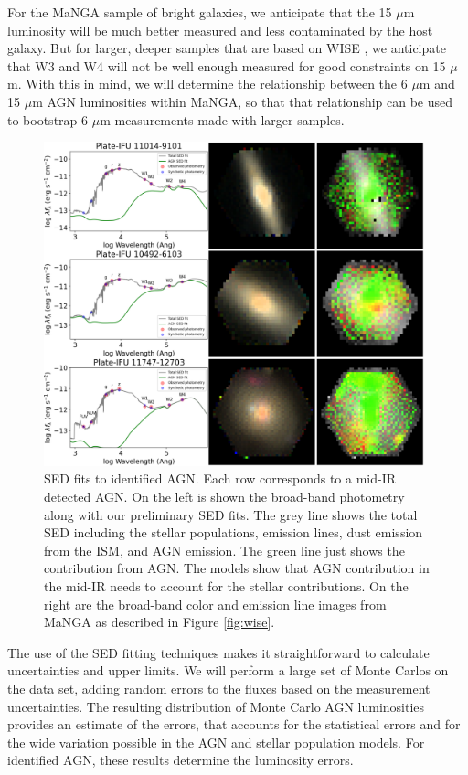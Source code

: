 \documentclass[12pt, preprint]{hacked-aastex}
\begin{document}
For the MaNGA sample of bright galaxies, we anticipate that the 
15 $\mu$m luminosity will be much better measured and less 
contaminated by the host galaxy.
But for larger, deeper samples that are based on  WISE 
\cite{assef18a, hviding22a}, we anticipate that W3 and W4 
will not be well enough measured for good constraints on 15 $\mu$m.
With this in mind, we will determine the relationship 
between the 6 $\mu$m and 15 $\mu$m AGN luminosities within MaNGA,
so that that relationship can be used to bootstrap 6 $\mu$m 
measurements made with larger samples.

\begin{figure}[t!]
\includegraphics[width=0.98\textwidth]{spec-grid.png}
    \caption{
\label{fig:fits} \small SED fits to identified AGN. Each row
corresponds to a mid-IR detected AGN. On the left is shown the
broad-band photometry along with our preliminary SED fits.  The grey
line shows the total SED including the stellar populations, emission
lines, dust emission from the ISM, and AGN emission. The green line
just shows the contribution from AGN. The models show that AGN
contribution in the mid-IR needs to account for the stellar
contributions. On the right are the broad-band color and emission line
images from MaNGA as described in Figure \ref{fig:wise}.}
\end{figure}

The use of the SED fitting techniques makes it straightforward to
calculate uncertainties and upper limits. We will perform a large set
of Monte Carlos on the data set, adding random errors to the fluxes
based on the measurement uncertainties. The resulting distribution of
Monte Carlo AGN luminosities provides an estimate of the errors, that
accounts for the statistical errors and for the wide variation
possible in the AGN and stellar population models. For identified AGN,
these results determine the luminosity errors.
\end{document}
